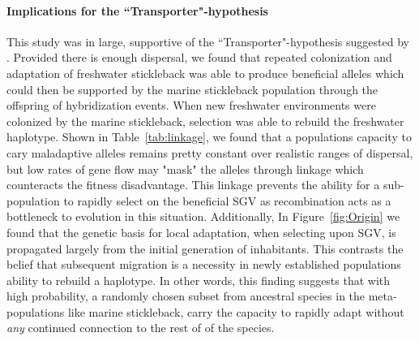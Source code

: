 \documentclass{article}
\begin{document}
\paragraph{Implications for the ``Transporter"-hypothesis}
This study was in large, supportive of the ``Transporter"-hypothesis suggested by \citep{schluter2009genetics}.
Provided there is enough dispersal, we found that repeated colonization and adaptation of freshwater stickleback was able to produce beneficial alleles which could then be 
supported by the marine stickleback population through the offspring of hybridization events. 
When new freshwater environments were colonized by the marine stickleback, selection was able to rebuild the freshwater haplotype. 
Shown in Table~\ref{tab:linkage}, we found that a populations capacity to cary maladaptive alleles remains pretty constant over realistic ranges of dispersal, but low rates of gene flow may 
"mask" the alleles through linkage which counteracts the fitness disadvantage. 
This linkage prevents the ability for a sub-population to rapidly select on the beneficial SGV as recombination acts as a bottleneck to evolution in this situation. 
Additionally, In Figure~\ref{fig:Origin} we found that the genetic basis for local adaptation, when selecting upon SGV, is propagated largely from the initial generation of inhabitants. 
This contrasts the belief that subsequent migration is a necessity in newly established populations ability to rebuild a haplotype.
In other words, this finding suggests that with high probability, a randomly chosen subset from ancestral species in the meta-populations like marine stickleback, 
carry the capacity to rapidly adapt without \emph{any} continued connection to the rest of of the species.


\end{document}
